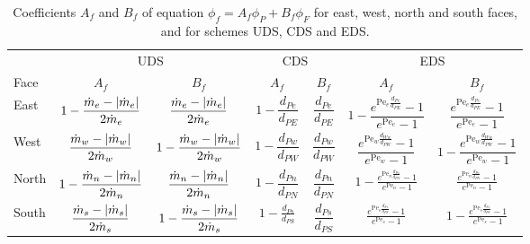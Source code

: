\begin{table}[h]
	\centering
	\begin{tabular}{lcccccc}
		\toprule[0.5mm]
		& \multicolumn{2}{c}{UDS} &  \multicolumn{2}{c}{CDS} &  \multicolumn{2}{c}{EDS} \\
		\cmidrule(r){2-3}  \cmidrule(lr){4-5}  \cmidrule(l){6-7}  
		Face & $A_f$ & $B_f$  & $A_f$ & $B_f$  & $A_f$ & $B_f$ \\
		\midrule[0.25mm]
		East & 
		$1 - \dfrac{\dot{m}_e - \abs{\dot{m}_e}}{2 \dot{m}_e}$ &
		$\dfrac{\dot{m}_e - \abs{\dot{m}_e}}{2 \dot{m}_e}$ &
		$1 - \dfrac{d_{Pe}}{d_{PE}}$ & 
		$\dfrac{d_{Pe}}{d_{PE}}$ & 
		$1 - \dfrac{e^{\mathrm{Pe}_e \frac{d_{Pe}}{d_{PE}}} - 1}{e^{\mathrm{Pe}_e} - 1}$ &
		$\dfrac{e^{\mathrm{Pe}_e \frac{d_{Pe}}{d_{PE}}} - 1}{e^{\mathrm{Pe}_e} - 1}$	
		\\
		
		West & $\dfrac{\dot{m}_w - \abs{\dot{m}_w}}{2 \dot{m}_w}$ &
		$1 - \dfrac{\dot{m}_w - \abs{\dot{m}_w}}{2 \dot{m}_w}$ & 
		$1 - \dfrac{d_{Pw}}{d_{PW}}$ & 
		$\dfrac{d_{Pw}}{d_{PW}}$ & 
		$\dfrac{e^{\mathrm{Pe}_w \frac{d_{Ww}}{d_{PW}}} - 1}{e^{\mathrm{Pe}_w} - 1}$ &
		$1 - \dfrac{e^{\mathrm{Pe}_w \frac{d_{Ww}}{d_{PW}}} - 1}{e^{\mathrm{Pe}_w} - 1}$
		\\
		
		North &
		$1 - \dfrac{\dot{m}_n - \abs{\dot{m}_n}}{2 \dot{m}_n}$ & 
		$\dfrac{\dot{m}_n - \abs{\dot{m}_n}}{2 \dot{m}_n}$ & 
		$1 - \dfrac{d_{Pn}}{d_{PN}}$ & 
		$\dfrac{d_{Pn}}{d_{PN}}$ & 
		$1 - \frac{e^{\mathrm{Pe}_n \frac{d_{Pn}}{d_{PN}}} - 1}{e^{\mathrm{Pe}_n} - 1}$ &
		$\frac{e^{\mathrm{Pe}_n \frac{d_{Pn}}{d_{PN}}} - 1}{e^{\mathrm{Pe}_n} - 1}$
		\\
		
		South &
		$\dfrac{\dot{m}_s - \abs{\dot{m}_s}}{2 \dot{m}_s}$ &
		$1 - \dfrac{\dot{m}_s - \abs{\dot{m}_s}}{2 \dot{m}_s}$ &
		$1 - \frac{d_{Ps}}{d_{PS}}$ & 
		$\dfrac{d_{Ps}}{d_{PS}}$ &
		$\frac{e^{\mathrm{Pe}_s \frac{d_{Ss}}{d_{PS}}} - 1}{e^{\mathrm{Pe}_s} - 1}$ &
		$1 - \frac{e^{\mathrm{Pe}_s \frac{d_{Ss}}{d_{PS}}} - 1}{e^{\mathrm{Pe}_s} - 1}$
		\\
		\bottomrule[0.5mm]
	\end{tabular}
	\caption{Coefficients $A_f$ and $B_f$ of equation $\phi_f = A_f \phi_P + B_f \phi_F$ for east, west, north and south faces, and for schemes UDS, CDS and EDS.}
	\label{tab:small_molecule_schemes_coefficients}
\end{table}


